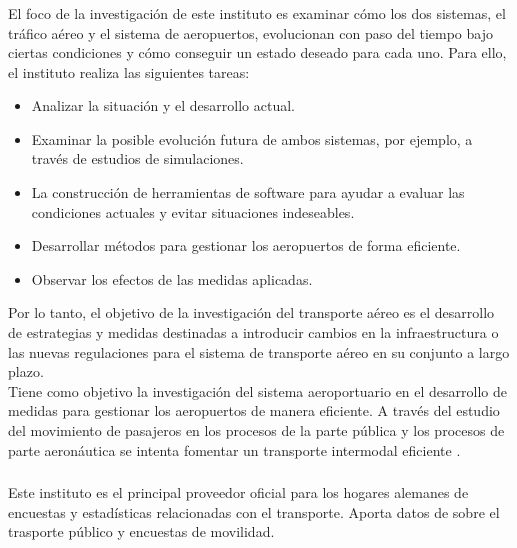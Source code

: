 \subsubsection{\fw{}}
El foco de la investigación de este instituto es examinar cómo los dos sistemas, el tráfico aéreo y el sistema de aeropuertos, evolucionan con paso del tiempo bajo ciertas condiciones y cómo conseguir un estado deseado para cada uno. Para ello, el instituto realiza las siguientes tareas:

\begin{itemize}
  \item Analizar la situación y el desarrollo actual.
  \item Examinar la posible evolución futura de ambos sistemas, por ejemplo, a través de estudios de simulaciones.
  \item La construcción de herramientas de software para ayudar a evaluar las condiciones actuales y evitar situaciones indeseables.
  \item Desarrollar métodos para gestionar los aeropuertos de forma eficiente.
  \item Observar los efectos de las medidas aplicadas.
\end{itemize}

Por lo tanto, el objetivo de la investigación del transporte aéreo es el desarrollo de estrategias y medidas destinadas a introducir cambios en la infraestructura o las nuevas regulaciones para el sistema de transporte aéreo en su conjunto a largo plazo.\\

Tiene como objetivo la investigación del sistema aeroportuario en el desarrollo de medidas para gestionar los aeropuertos de manera eficiente. A través del estudio del movimiento de pasajeros en los procesos de la parte pública y los procesos de parte aeronáutica se intenta fomentar un transporte intermodal eficiente \cite{fwHome}.


\subsubsection{\vf{}}
Este instituto es el principal proveedor oficial para los hogares alemanes de encuestas y estadísticas relacionadas con el transporte. Aporta datos de sobre el trasporte público y encuestas de movilidad.\\ 

